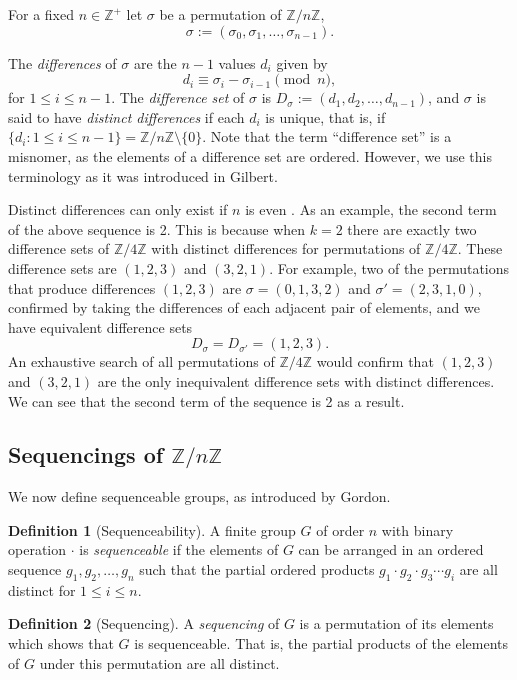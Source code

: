 \documentclass[12pt]{article}
\theoremstyle{plain}
\theoremstyle{definition}
\newtheorem{definition}{Definition}
\theoremstyle{remark}
\newcommand{\ZZ}{\mathbb{Z}}
\newcommand{\seqvar}{\sigma}
\newcommand{\differenceset}[1]{D_{#1}}
\begin{document}
For a fixed $n\in\ZZ^+$ let $\seqvar$ be a permutation of $\ZZ/n\ZZ$,
\[\seqvar := (\seqvar_0, \seqvar_1,\ldots,\seqvar_{n-1}).\]

The \textit{differences} of $\seqvar$ are the $n-1$ values $d_i$ given by
\[d_i\equiv\seqvar_i-\seqvar_{i-1}\pmod{n},\] 
for $1\leq i\leq n-1$. The \textit{difference set} of $\sigma$ is $\differenceset{\seqvar}:=(d_1, d_2,\ldots,d_{n-1})$, and $\sigma$ is said to have \textit{distinct differences} if each $d_i$ is unique, that is, if $\{d_i:1\leq i\leq n-1\}=\ZZ/n\ZZ\setminus\{0\}$. Note that the term ``difference set'' is a misnomer, as the elements of a difference set are ordered. However, we use this terminology as it was introduced in Gilbert\cite{Gil}. 

Distinct differences can only exist if $n$ is even \cite{Baker}. As an example, the second term of the above sequence is 2. This is because when $k=2$ there are exactly two difference sets of $\ZZ/4\ZZ$ with distinct differences for permutations of $\ZZ / 4\ZZ$. These difference sets are $(1, 2, 3)$ and $(3, 2, 1)$.  For example, two of the permutations that produce differences $(1, 2, 3)$ are $\seqvar = (0,1,3,2)$ and $\seqvar'=(2,3,1,0)$, confirmed by taking the differences of each adjacent pair of elements, and we have equivalent difference sets
\[D_{\seqvar}=D_{\seqvar'}=(1,2,3).\]
An exhaustive search of all permutations of $\ZZ / 4\ZZ$ would confirm that $(1,2,3)$ and $(3,2,1)$ are the only inequivalent difference sets with distinct differences. We can see that the second term of the sequence is 2 as a result.

\subsection{Sequencings of \texorpdfstring{$\ZZ/n\ZZ$}{Z/nZ}}

We now define sequenceable groups, as introduced by Gordon\cite{Gor}. 


\begin{definition}[Sequenceability] A finite group $G$ of order $n$ with binary operation $\cdot$ is  \textit{sequenceable} if the elements of $G$ can be arranged in an ordered sequence $g_1,g_2,\ldots,g_n$ such that the partial ordered products $g_1\cdot g_2\cdot g_3\cdots g_i$ are all distinct for $1\leq i\leq n$.
\end{definition}

\begin{definition}[Sequencing]
A \textit{sequencing} of $G$ is a permutation of its elements which shows that $G$ is sequenceable. That is, the partial products of the elements of $G$ under this permutation are all distinct. 
\end{definition}
\end{document}

